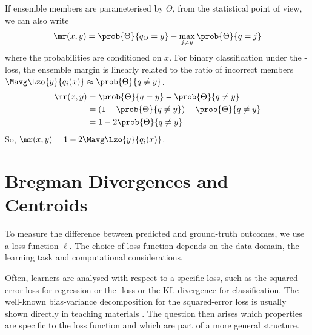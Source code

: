 \documentclass[
    a4paper, %
	fontsize=10pt, %
	twoside=false, %
]{kaobook}
\begin{document}
If ensemble members are parameterised by $\Theta$, from the statistical point of view, we can also write
$$
\mr(x,y) = \prob{\Theta}{q_{\Theta} = y} - \max_{j \not=y} \prob{\Theta}{q=j}
$$
where the probabilities are conditioned on $x$. For binary classification under the \zeroone-loss, the ensemble margin is linearly related to the ratio of incorrect members $\Mavg \Lzo{y}{q_{i}(x)} \approx \prob{\Theta}{q \not= y}$.
$$
\begin{align*}
\mr(x,y) &= \prob{\Theta}{q=y}  - \prob{\Theta}{q \not= y} \\
&= (1 - \prob{\Theta}{q \not= y}) - \prob{\Theta}{q \not= y} \\
&= 1 - 2 \prob{\Theta}{q \not= y}
\end{align*}
$$
So, $\mr(x,y) = 1 - 2 \Mavg\Lzo{y}{q_{i}(x)}$.



\section{Bregman Divergences and Centroids}

To measure the difference between predicted and ground-truth outcomes, we use a loss function $\ell$. The choice of loss function depends on the data domain, the learning task and computational considerations. 

Often, learners are analysed with respect to a specific loss, such as the squared-error loss \cite{scornet_ConsistencyRandomForests_2015} for regression or the \zeroone-loss \cite{theisen_WhenAreEnsembles_2023} or the KL-divergence \cite{webb_EnsembleNotEnsemble_2019} for classification. The well-known bias-variance decomposition for the squared-error loss is usually shown directly in teaching materials \cite{tibshirani_ElementsStatisticalLearning_2017, weinberger_Lecture12Bias_}. The question then arises which properties are specific to the loss function and which are part of a more general structure.
\end{document}
